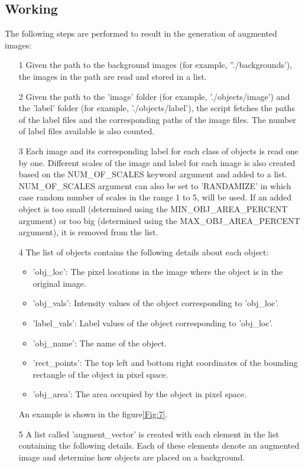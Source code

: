 \documentclass[paper=a4,11pt,parskip=half,toc=listof]{scrartcl}
\begin{document}
\subsection{Working}
The following steps are performed to result in the generation of augmented images:
	\begin{itemize}
	\label{List:1}
		\item[1] Given the path to the background images (for example, ''./backgrounds'), the images in the path are read and stored in a list.
		\item[2] Given the path to the 'image' folder (for example, './objects/image') and the 'label' folder (for example, './objects/label'), the script fetches the paths of the label files and the corresponding paths of the image files. The number of label files available is also counted.
		\item[3] Each image and its corresponding label for each class of objects is read one by one. Different scales of the image and label for each image is also created based on the NUM\_OF\_SCALES keyword argument and added to a list. NUM\_OF\_SCALES argument can also be set to 'RANDAMIZE' in which case random number of scales in the range 1 to 5, will be used. If an added object is too small (determined using the MIN\_OBJ\_AREA\_PERCENT argument) or too big (determined using the MAX\_OBJ\_AREA\_PERCENT argument), it is removed from the list.
		\item[4] The list of objects contains the following details about each object:
			\begin{itemize}
				\item 'obj\_loc': The pixel locations in the image where the object is in the original image.
				\item 'obj\_vals': Intensity values of the object corresponding to 'obj\_loc'.
				\item 'label\_vals': Label values of the object corresponding to 'obj\_loc'.
				\item 'obj\_name': The name of the object.
				\item 'rect\_points': The top left and bottom right coordinates of the bounding rectangle of the object in pixel space.
				\item 'obj\_area': The area occupied by the object in pixel space.
			\end{itemize}
		An example is shown in the figure\ref{Fig:7}.
		\item[5] A list called 'augment\_vector' is created with each element in the list containing the following details. Each of these elements denote an augmented image and determine how objects are placed on a background.

\end{itemize}
\end{document}

